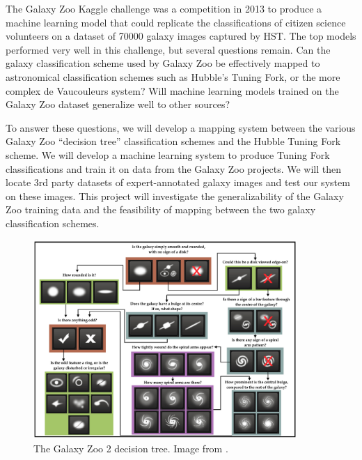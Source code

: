 \documentclass{article}
\begin{document}
The Galaxy Zoo Kaggle challenge was a competition in 2013 to produce a machine learning model that could replicate the classifications of citizen science volunteers on a dataset of 70000 galaxy images captured by HST. The top models performed very well in this challenge, but several questions remain. Can the galaxy classification scheme used by Galaxy Zoo be effectively mapped to astronomical classification schemes such as Hubble's Tuning Fork, or the more complex de Vaucouleurs system? Will machine learning models trained on the Galaxy Zoo dataset generalize well to other sources? 

To answer these questions, we will develop a mapping system between the various Galaxy Zoo “decision tree” classification schemes and the Hubble Tuning Fork scheme. We will develop a machine learning system to produce Tuning Fork classifications and train it on data from the Galaxy Zoo projects. We will then locate 3rd party datasets of expert-annotated galaxy images and test our system on these images. This project will investigate the generalizability of the Galaxy Zoo training data and the feasibility of mapping between the two galaxy classification schemes. 


\begin{figure}[h]
  \centering
	\includegraphics[width=100mm]{../img/GZ2_tree.png}
  \caption{The Galaxy Zoo 2 decision tree. Image from \cite{2013MNRAS.435.2835W}.}
  \label{fig:GZ2tree}
\end{figure}
\end{document}
